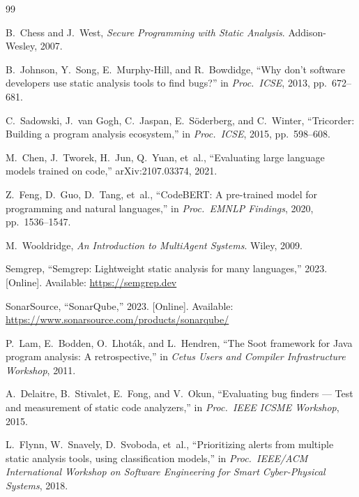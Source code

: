 \documentclass[conference]{IEEEtran}
\begin{document}


\begin{thebibliography}{99}

B.~Chess and J.~West, \textit{Secure Programming with Static Analysis}. Addison-Wesley, 2007.

B.~Johnson, Y.~Song, E.~Murphy-Hill, and R.~Bowdidge, ``Why don't software developers use static analysis tools to find bugs?'' in \textit{Proc.\ ICSE}, 2013, pp.~672--681.

C.~Sadowski, J.~van Gogh, C.~Jaspan, E.~Söderberg, and C.~Winter, ``Tricorder: Building a program analysis ecosystem,'' in \textit{Proc.\ ICSE}, 2015, pp.~598--608.

M.~Chen, J.~Tworek, H.~Jun, Q.~Yuan, et~al., ``Evaluating large language models trained on code,'' arXiv:2107.03374, 2021.

Z.~Feng, D.~Guo, D.~Tang, et~al., ``CodeBERT: A pre-trained model for programming and natural languages,'' in \textit{Proc.\ EMNLP Findings}, 2020, pp.~1536--1547.

M.~Wooldridge, \textit{An Introduction to MultiAgent Systems}. Wiley, 2009.

Semgrep, ``Semgrep: Lightweight static analysis for many languages,'' 2023. [Online]. Available: \url{https://semgrep.dev}

SonarSource, ``SonarQube,'' 2023. [Online]. Available: \url{https://www.sonarsource.com/products/sonarqube/}

P.~Lam, E.~Bodden, O.~Lhoták, and L.~Hendren, ``The Soot framework for Java program analysis: A retrospective,'' in \textit{Cetus Users and Compiler Infrastructure Workshop}, 2011.

A.~Delaitre, B.~Stivalet, E.~Fong, and V.~Okun, ``Evaluating bug finders --- Test and measurement of static code analyzers,'' in \textit{Proc.\ IEEE ICSME Workshop}, 2015.

L.~Flynn, W.~Snavely, D.~Svoboda, et~al., ``Prioritizing alerts from multiple static analysis tools, using classification models,'' in \textit{Proc.\ IEEE/ACM International Workshop on Software Engineering for Smart Cyber-Physical Systems}, 2018.


\end{thebibliography}
\end{document}
